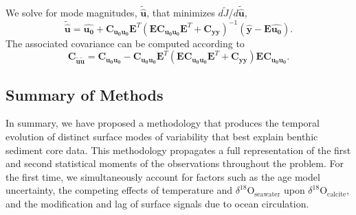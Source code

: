 \documentclass[draft]{agujournal2019}
\begin{document}
We solve for mode magnitudes, $\mathbf{\tilde{\hat{u}}}$, that minimizes $d\tilde{J}$/$d\mathbf{\tilde{\hat{u}}}$,  %
\begin{equation}
\mathbf{\tilde{\hat{u}}} = \mathbf{\hat{u_{0}}} + \mathbf{C_{u_{0}u_{0}}} \mathbf{E}^T\left(\mathbf{E}\mathbf{C_{u_{0}u_{0}}}\mathbf{E}^T + \mathbf{C_{yy}}\right)^{-1}\left(\mathbf{\hat{y}}-\mathbf{E\hat{u_0}}\right)
\label{eq:twls}.
\end{equation}
The associated covariance can be computed according to
\begin{equation}
\mathbf{C_{\tilde{u}\tilde{u}}} = \mathbf{C_{u_0u_0}}-\mathbf{C_{u_0u_0}}\mathbf{E}^T(\mathbf{E}\mathbf{C_{u_0u_0}}\mathbf{E}^T + \mathbf{C_{yy}}) \mathbf{E}\mathbf{C_{u_0u_0}}.
\label{eq:twlsCuu}
\end{equation}
\subsection{Summary of Methods \label{sec:som}}
In summary, we have proposed a methodology that produces the temporal evolution of distinct surface modes of variability that best explain benthic sediment core data. This methodology propagates a full representation of the first and second statistical moments of the observations throughout the problem. For the first time, we simultaneously account for factors such as the age model uncertainty, the competing effects of temperature and $\delta^{18}\mathrm{O}_{\mathrm{seawater}}$ upon $\delta^{18}\mathrm{O}_{\mathrm{calcite}}$, and the modification and lag of surface signals due to ocean circulation. 
\end{document}

